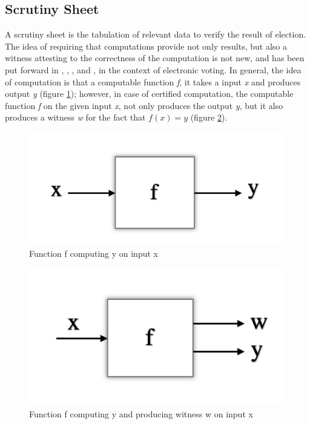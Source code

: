    \subsection{Scrutiny Sheet}
   A scrutiny sheet is the tabulation of relevant data to verify the result of election. 
   The idea of requiring that computations provide not only results, but also a witness attesting
    to the correctness of the computation is not new,
	and has been put forward in \citep{89397},  
	\citep{MCCONNELL2011119},
	\citep{Arkoudas:2005:DRC}, and \citep{Schurmann:2009:EET},  \citep{Pattinson:2015:VCM} in the context
	of electronic voting.   In general, the idea of computation is that a computable function \textit{f}, it takes 
	a input \textit{x} and produces output \textit{y} (figure \ref{fig:fnxy}); however, in case of
	 certified computation, 
	the computable function \textit{f} on the given input \textit{x}, not only produces the output \textit{y},
	but it also produces a witness \textit{w} for the fact that $ f (x) = y$ (figure \ref{fig:fnxyw}).
	
	\begin{figure}[h!]
	\centering
  \includegraphics[width=0.5\linewidth]{figs/function_fx.png}
  \caption{Function f computing y on input x}
  \label{fig:fnxy}
  \end{figure} 
  
  \begin{figure}[h!]
  \centering
  \includegraphics[width=0.5\linewidth]{figs/funcxy.png}
  \caption{Function f computing y and producing witness w on input x}
  \label{fig:fnxyw}
  \end{figure} 




